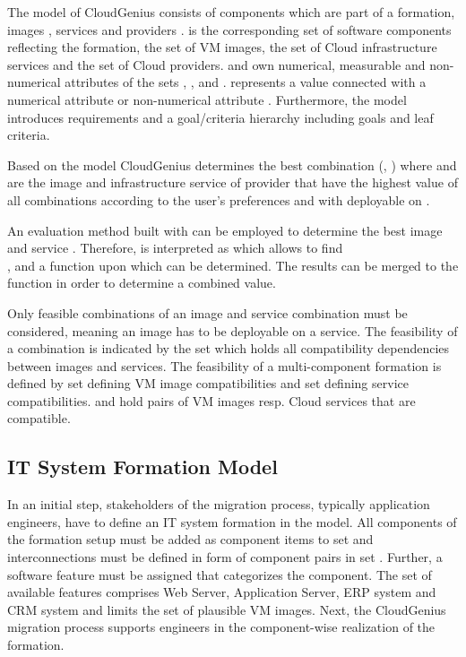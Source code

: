 \documentclass[10pt]{article}
\begin{document}
The model of CloudGenius consists of  components which are part of a formation,  images ,  services  and  providers .  is the corresponding set of software components reflecting the formation,  the set of VM images,  the set of Cloud infrastructure services and  the set of Cloud providers.  and  own numerical, measurable and non-numerical attributes of the sets , ,  and .  represents a value connected with a numerical attribute  or non-numerical attribute . Furthermore, the model introduces  requirements and a goal/criteria hierarchy including  goals and  leaf criteria. 


Based on the model CloudGenius determines the best combination (, ) where  and  are the image and infrastructure service of provider  that have the highest value of all combinations according to the user's preferences and with  deployable on . 

An evaluation method built with  can be employed to determine the best image  and service . Therefore,  is interpreted as  which allows to find\\ , and a function  upon which  can be determined. The results can be merged to the function  in order to determine a combined value.

Only feasible combinations of an image and service combination must be considered, meaning an image has to be deployable on a service. The feasibility of a combination is indicated by the set  which holds all compatibility dependencies between images and services. The feasibility of a multi-component formation is defined by set  defining VM image compatibilities and set  defining service compatibilities.  and  hold pairs of VM images resp. Cloud services that are compatible.

\subsection{IT System Formation Model}

In an initial step, stakeholders of the migration process, typically application engineers, have to define an IT system formation in the model. All components of the formation setup must be added as component items  to set  and interconnections must be defined in form of component pairs  in set . Further, a software feature must be assigned that categorizes the component. The set of available features comprises Web Server, Application Server, ERP system and CRM system and limits the set of plausible VM images. Next, the CloudGenius migration process supports engineers in the component-wise realization of the formation.
\end{document}
